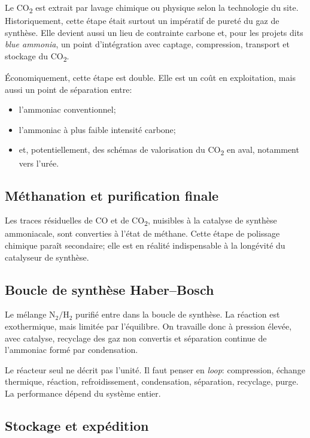 \documentclass[11pt]{article}
\begin{document}
Le CO\textsubscript{2} est extrait par lavage chimique ou physique selon la technologie du site. Historiquement, cette étape était surtout un impératif de pureté du gaz de synthèse. Elle devient aussi un lieu de contrainte carbone et, pour les projets dits \emph{blue ammonia}, un point d'intégration avec captage, compression, transport et stockage du CO\textsubscript{2}.

Économiquement, cette étape est double. Elle est un coût en exploitation, mais aussi un point de séparation entre:
\begin{itemize}[leftmargin=1.6em]
    \item l'ammoniac conventionnel;
    \item l'ammoniac à plus faible intensité carbone;
    \item et, potentiellement, des schémas de valorisation du CO\textsubscript{2} en aval, notamment vers l'urée.
\end{itemize}

\subsection{Méthanation et purification finale}

Les traces résiduelles de CO et de CO\textsubscript{2}, nuisibles à la catalyse de synthèse ammoniacale, sont converties à l'état de méthane. Cette étape de polissage chimique paraît secondaire; elle est en réalité indispensable à la longévité du catalyseur de synthèse.

\subsection{Boucle de synthèse Haber--Bosch}

Le mélange \(\mathrm{N_2/H_2}\) purifié entre dans la boucle de synthèse. La réaction est exothermique, mais limitée par l'équilibre. On travaille donc à pression élevée, avec catalyse, recyclage des gaz non convertis et séparation continue de l'ammoniac formé par condensation.

Le réacteur seul ne décrit pas l'unité. Il faut penser en \emph{loop}: compression, échange thermique, réaction, refroidissement, condensation, séparation, recyclage, purge. La performance dépend du système entier.

\subsection{Stockage et expédition}
\end{document}
